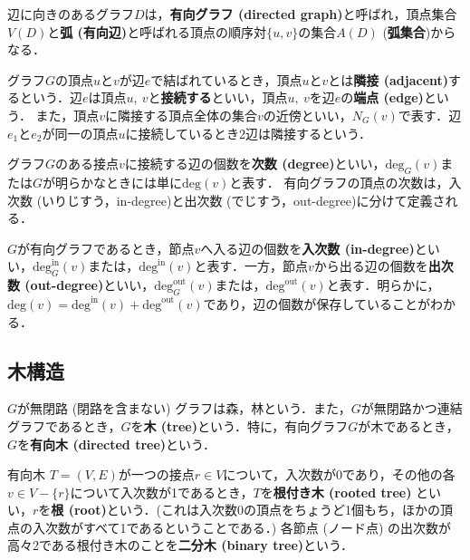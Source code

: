 \begin{definition}[有向グラフ]
    辺に向きのあるグラフ$D$は，\textbf{有向グラフ (directed graph)}と呼ばれ，頂点集合$V(D)$と\textbf{弧 (有向辺)}と呼ばれる頂点の順序対$\{u,v\}$の集合$A(D)$ (\textbf{弧集合})からなる．
\end{definition}

\begin{definition}[端点，隣接，接続]
グラフ$G$の頂点$u$と$v$が辺$e$で結ばれているとき，頂点$u$と$v$とは\textbf{隣接 (adjacent)}するという．辺$e$は頂点$u,\ v$と\textbf{接続する}といい，頂点$u,\ v$を辺$e$の\textbf{端点 (edge)}という．
また，頂点$v$に隣接する頂点全体の集合$v$の近傍といい，$N_G(v)$で表す．辺$e_1$と$e_2$が同一の頂点$u$に接続しているとき2辺は隣接するという．
\end{definition}

グラフ$G$のある接点$v$に接続する辺の個数を\textbf{次数 (degree)}といい，$\text{deg}_G(v)$または$G$が明らかなときには単に$\text{deg}(v)$と表す．
有向グラフの頂点の次数は，入次数 (いりじすう，in-degree)と出次数 (でじすう，out-degree)に分けて定義される．
\begin{definition}
    $G$が有向グラフであるとき，節点$v$へ入る辺の個数を\textbf{入次数 (in-degree)}といい，$\text{deg}_G^{\text{in}}(v)$または，$\text{deg}^{\text{in}}(v)$と表す．一方，節点$v$から出る辺の個数を\textbf{出次数 (out-degree)}といい，$\text{deg}_G^{\text{out}}(v)$または，$\text{deg}^{\text{out}}(v)$と表す．明らかに，$\text{deg}(v)=\text{deg}^{\text{in}}(v)+\text{deg}^{\text{out}}(v)$であり，辺の個数が保存していることがわかる．
\end{definition}



\subsection{木構造}
\begin{definition}
    $G$が無閉路 (閉路を含まない) グラフは森，林という．また，$G$が無閉路かつ連結グラフであるとき，$G$を\textbf{木 (tree)}という．特に，有向グラフ$G$が木であるとき，$G$を\textbf{有向木 (directed tree)}という．
\end{definition}

\begin{definition}
    有向木 $T=(V,E)$が一つの接点$r\in V$について，入次数が0であり，その他の各$v\in V-\{r\}$について入次数が1であるとき，$T$を\textbf{根付き木 (rooted tree)} といい，$r$を\textbf{根 (root)}という．(これは入次数0の頂点をちょうど1個もち，ほかの頂点の入次数がすべて1であるということである．) 各節点 (ノード点) の出次数が高々2である根付き木のことを\textbf{二分木 (binary tree)}という． 
\end{definition}
